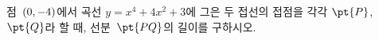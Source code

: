 점~$(0{,}\mkern3mu\mathopen{}-4)$에서 곡선 $y=x^4+4x^2+3$에 그은 두 접선의 접점을 각각 $\pt{P}$, $\pt{Q}$라 할 때, 선분~$\pt{PQ}$의 길이를 구하시오.
